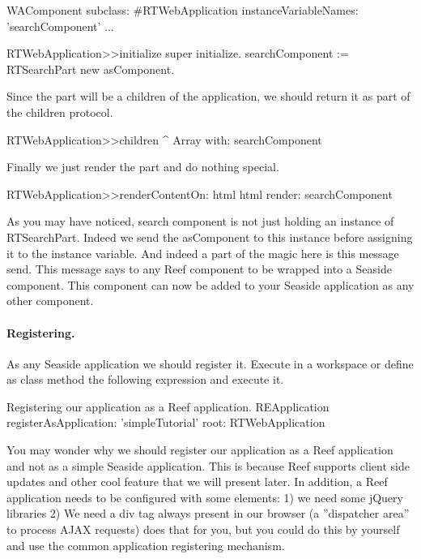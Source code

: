 \documentclass[a4paper,10pt,twoside]{book}
\begin{document}
\begin{code}{}
WAComponent subclass: #RTWebApplication
	instanceVariableNames: 'searchComponent'
	...
\end{code}


\begin{code}{}
RTWebApplication>>initialize
	super initialize.
	searchComponent := RTSearchPart new asComponent.
\end{code}

Since the part will be a children of the application, we should return it as part of the children protocol. 

\begin{code}{}
RTWebApplication>>children
	^ Array with: searchComponent
\end{code}

Finally we just render the part and do nothing special. 

\begin{code}{}
RTWebApplication>>renderContentOn: html
	html render: searchComponent
\end{code}

As you may have noticed, search component is not just holding an instance of RTSearchPart. Indeed we send the asComponent to this instance before assigning it to the instance variable. And indeed a part of the magic here is this  message send. This message says to any Reef component to be wrapped into a Seaside component. This component can now be added to your Seaside application as any other component.

\paragraph{Registering.} As any Seaside application we should register it. Execute in a workspace or define as class method the following expression and execute it. 

\begin{code}{Registering our application as a Reef application.}
REApplication 
	registerAsApplication: 'simpleTutorial'
	root: RTWebApplication
\end{code}


You may wonder why we should register our application as a Reef application and not as a simple Seaside application. This is because
Reef supports client side updates and other cool feature that we will present later. 
In addition, a Reef application needs to be configured with some elements: 1) we need some jQuery libraries 2) We need a div tag always present in our browser (a ''dispatcher area'' to process AJAX requests)  does that for you, but you could do this by yourself and use the common application registering mechanism.
\end{document}
